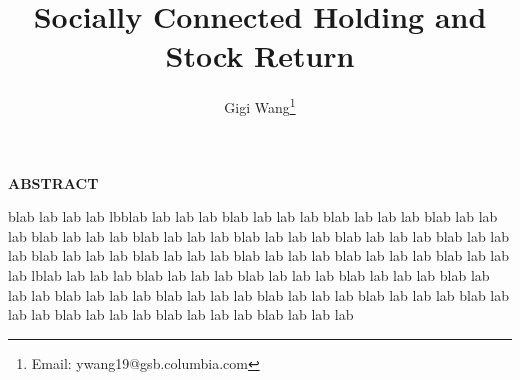 \documentclass[11pt]{article}
\begin{document}
\onehalfspacing      %
\renewcommand{\footnote}{\endnote}  %

\author{Gigi Wang\thanks{Email: ywang19@gsb.columbia.com}}

\title{\huge \bf Socially Connected Holding and Stock Return}

\date{}              %


\maketitle
\thispagestyle{empty}

\bigskip

\centerline{\bf ABSTRACT}

\begin{doublespace}  %
  \noindent blab lab lab lab lbblab lab lab lab blab lab lab lab blab lab lab lab blab lab lab lab blab lab lab lab blab lab lab lab blab lab lab lab blab lab lab lab blab lab lab lab blab lab lab lab blab lab lab lab blab lab lab lab blab lab lab lab blab lab lab lab lblab lab lab lab blab lab lab lab blab lab lab lab blab lab lab lab blab lab lab lab blab lab lab lab blab lab lab lab blab lab lab lab blab lab lab lab blab lab lab lab blab lab lab lab blab lab lab lab blab lab lab lab 
\end{doublespace}

\medskip
\clearpage
\end{document}
